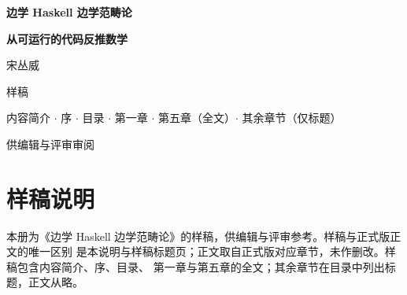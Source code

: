 \documentclass[11pt,a4paper,fontset=fandol]{ctexbook}
\begin{document}
\begin{titlepage}
  \centering
  \vspace*{3.2cm}
  {\Large\bfseries 边学 Haskell 边学范畴论\par}
  \vspace{0.4cm}
  {\large\bfseries 从可运行的代码反推数学\par}
  \vspace{1.2cm}
  {\large 宋丛威\par}
  \vspace{2.2cm}
  {\large 样稿\par}
  \vspace{0.4cm}
  {\normalsize 内容简介 $\cdot$ 序 $\cdot$ 目录 $\cdot$ 第一章 $\cdot$ 第五章（全文）$\cdot$ 其余章节（仅标题）\par}
  \vspace{1.2cm}
  {\small 供编辑与评审审阅\par}
\end{titlepage}

\frontmatter

\chapter*{样稿说明}

本册为《边学 Haskell 边学范畴论》的样稿，供编辑与评审参考。样稿与正式版正文的唯一区别
是本说明与样稿标题页；正文取自正式版对应章节，未作删改。样稿包含内容简介、序、目录、
第一章与第五章的全文；其余章节在目录中列出标题，正文从略。


\tableofcontents

\mainmatter
\setcounter{secnumdepth}{3}

\end{document}
